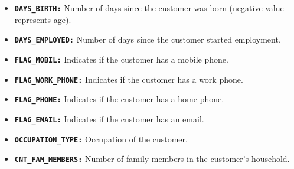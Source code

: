 \documentclass[12pt]{report}
\begin{document}
\begin{itemize}
\begin{itemize}
            \item {\bfseries \texttt{DAYS\_BIRTH:}} Number of days since the customer was born (negative value represents age).
            \item {\bfseries \texttt{DAYS\_EMPLOYED:}} Number of days since the customer started employment.
            \item {\bfseries \texttt{FLAG\_MOBIL:}} Indicates if the customer has a mobile phone.
            \item {\bfseries \texttt{FLAG\_WORK\_PHONE:}} Indicates if the customer has a work phone.
            \item {\bfseries \texttt{FLAG\_PHONE:}} Indicates if the customer has a home phone.
            \item {\bfseries \texttt{FLAG\_EMAIL:}} Indicates if the customer has an email.
            \item {\bfseries \texttt{OCCUPATION\_TYPE:}} Occupation of the customer.
            \item {\bfseries \texttt{CNT\_FAM\_MEMBERS:}} Number of family members in the customer’s household.
        \end{itemize}
    \end{itemize}
\end{document}
